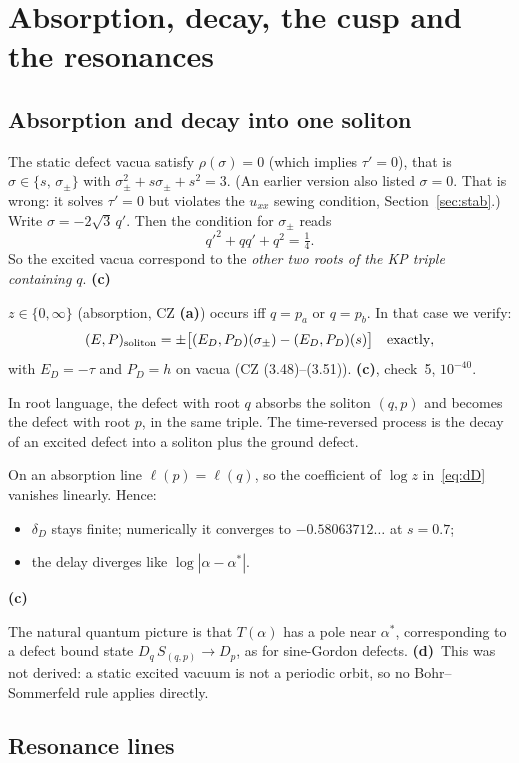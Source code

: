 \documentclass[11pt,a4paper]{article}
\newcommand{\La}{\textsf{\textbf{(a)}}}\newcommand{\Lb}{\textsf{\textbf{(b)}}}
\newcommand{\Lc}{\textsf{\textbf{(c)}}}\newcommand{\Ld}{\textsf{\textbf{(d)}}}
\begin{document}
\section{Absorption, decay, the cusp and the resonances}

\subsection{Absorption and decay into one soliton}

The static defect vacua satisfy $\rho(\sigma)=0$ (which implies $\tau'=0$), that is $\sigma\in\{s,\,\sigma_\pm\}$ with $\sigma_\pm^2+s\sigma_\pm+s^2=3$. (An earlier version also listed $\sigma=0$. That is wrong: it solves $\tau'=0$ but violates the $u_{xx}$ sewing condition, Section~\ref{sec:stab}.) Write $\sigma=-2\sqrt3\,q'$. Then the condition for $\sigma_\pm$ reads
\[
q'^2+qq'+q^2=\tfrac14 .
\]
So the excited vacua correspond to the \emph{other two roots of the KP triple containing $q$}. \Lc

$z\in\{0,\infty\}$ (absorption, CZ \La) occurs iff $q=p_a$ or $q=p_b$. In that case we verify:
\[
(E,P)_{\rm soliton}=\pm\big[(E_D,P_D)(\sigma_\pm)-(E_D,P_D)(s)\big]\quad\text{exactly},
\]
with $E_D=-\tau$ and $P_D=h$ on vacua (CZ (3.48)--(3.51)). \Lc, check~5, $10^{-40}$.

In root language, the defect with root $q$ absorbs the soliton $(q,p)$ and becomes the defect with root $p$, in the same triple. The time-reversed process is the decay of an excited defect into a soliton plus the ground defect.

On an absorption line $\ell(p)=\ell(q)$, so the coefficient of $\log z$ in~\eqref{eq:dD} vanishes linearly. Hence:
\begin{itemize}
\item $\delta_D$ stays finite; numerically it converges to $-0.58063712\ldots$ at $s=0.7$;
\item the delay diverges like $\log|\alpha-\alpha^*|$.
\end{itemize}
\Lc

The natural quantum picture is that $T(\alpha)$ has a pole near $\alpha^*$, corresponding to a defect bound state $D_{q}\,S_{(q,p)}\to D_{p}$, as for sine-Gordon defects. \Ld\ This was not derived: a static excited vacuum is not a periodic orbit, so no Bohr--Sommerfeld rule applies directly.

\subsection{Resonance lines}
\end{document}
